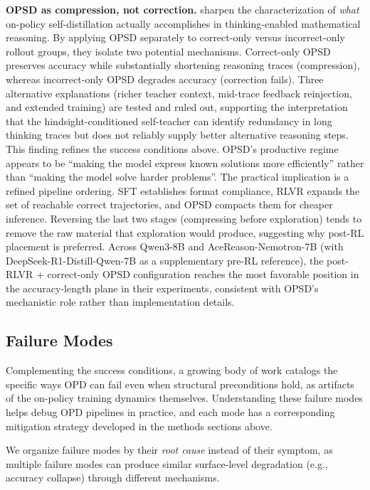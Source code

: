 \documentclass{article} %
\begin{document}
\textbf{OPSD as compression, not correction.} \citet{2605.06188} sharpen the characterization of \emph{what} on-policy self-distillation actually accomplishes in thinking-enabled mathematical reasoning. By applying OPSD separately to correct-only versus incorrect-only rollout groups, they isolate two potential mechanisms. Correct-only OPSD preserves accuracy while substantially shortening reasoning traces (compression), whereas incorrect-only OPSD degrades accuracy (correction fails). Three alternative explanations (richer teacher context, mid-trace feedback reinjection, and extended training) are tested and ruled out, supporting the interpretation that the hindsight-conditioned self-teacher can identify redundancy in long thinking traces but does not reliably supply better alternative reasoning steps. This finding refines the success conditions above. OPSD's productive regime appears to be ``making the model express known solutions more efficiently'' rather than ``making the model solve harder problems''. The practical implication is a refined pipeline ordering. SFT establishes format compliance, RLVR expands the set of reachable correct trajectories, and OPSD compacts them for cheaper inference. Reversing the last two stages (compressing before exploration) tends to remove the raw material that exploration would produce, suggesting why post-RL placement is preferred. Across Qwen3-8B and AceReason-Nemotron-7B (with DeepSeek-R1-Distill-Qwen-7B as a supplementary pre-RL reference), the post-RLVR + correct-only OPSD configuration reaches the most favorable position in the accuracy-length plane in their experiments, consistent with OPSD's mechanistic role rather than implementation details.

\subsection{Failure Modes}
\label{subsec:failure}

Complementing the success conditions, a growing body of work catalogs the specific ways OPD can fail even when structural preconditions hold, as artifacts of the on-policy training dynamics themselves. Understanding these failure modes helps debug OPD pipelines in practice, and each mode has a corresponding mitigation strategy developed in the methods sections above.

We organize failure modes by their \emph{root cause} instead of their symptom, as multiple failure modes can produce similar surface-level degradation (e.g., accuracy collapse) through different mechanisms.
\end{document}
